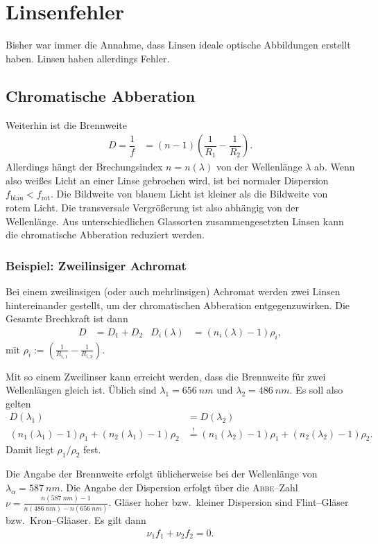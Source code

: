 \documentclass[a4paper,12pt]{article}
\numberwithin{equation}{section}
\begin{document}
\newpage
\section{Linsenfehler}
Bisher war immer die Annahme, dass Linsen ideale optische Abbildungen erstellt haben. Linsen haben allerdings Fehler.

\subsection{Chromatische Abberation}
Weiterhin ist die Brennweite
\begin{align} 
        D=\dfrac{1}{f}&=\left(n-1\right)\left(\dfrac{1}{R_1}-\dfrac{1}{R_2}\right)
.\end{align} 
Allerdings hängt der Brechungsindex $n=n\left(\lambda \right)$ von der Wellenlänge $\lambda $ ab.
Wenn also weißes Licht an einer Linse gebrochen wird, ist bei normaler Dispersion $f_{\text{blau}}<f_{\text{rot}}$. 
Die Bildweite von blauem Licht ist kleiner als die Bildweite von rotem Licht.
Die transversale Vergrößerung ist also abhängig von der Wellenlänge.
Aus unterschiedlichen Glassorten zusammengesetzten Linsen kann die chromatische Abberation reduziert werden.

\subsubsection{Beispiel: Zweilinsiger Achromat}
Bei einem zweilinsigen (oder auch mehrlinsigen) Achromat werden zwei Linsen hintereinander gestellt, um der chromatischen Abberation entgegenzuwirken.
Die Gesamte Brechkraft ist dann
\begin{align} 
        D&=D_1+D_2&D_i\left(\lambda \right)&=\left(n_i\left(\lambda \right)-1\right)\rho _i
,\end{align} 
mit $\rho _i:=\left(\tfrac{1}{R_{i,1}}-\tfrac{1}{R_{i,2}}\right)$.\par
Mit so einem Zweilinser kann erreicht werden, dass die Brennweite für zwei Wellenlängen gleich ist.
Üblich sind $\lambda _1=\SI{656}{nm}$ und $\lambda _2=\SI{486}{nm}$.
Es soll also gelten
\begin{align} 
        D\left(\lambda _1\right)&=D\left(\lambda _2\right)\\
        \left(n_1\left(\lambda _1\right)-1\right)\rho _1+\left(n_2\left(\lambda _1\right)-1\right)\rho _2&\stackrel{!}{=}\left(n_1\left(\lambda _2\right)-1\right)\rho _1+\left(n_2\left(\lambda _2\right)-1\right)\rho _2
.\end{align} 
Damit liegt $\rho _1/\rho _2$ fest.\par
Die Angabe der Brennweite erfolgt üblicherweise bei der Wellenlänge von $\lambda _\alpha =\SI{587}{nm}$.
Die Angabe der Dispersion erfolgt über die \textsc{Abbe}--Zahl $\nu =\tfrac{n\left(\SI{587}{nm}\right)-1}{n\left(\SI{486}{nm}\right)-n\left(\SI{656}{nm}\right)}$. 
Gläser hoher bzw.\ kleiner Dispersion sind Flint--Gläser bzw.\ Kron--Gläaser.
Es gilt dann
\begin{align} 
        \nu _1f_1+\nu _2 f_2=0
.\end{align} 
\end{document}
